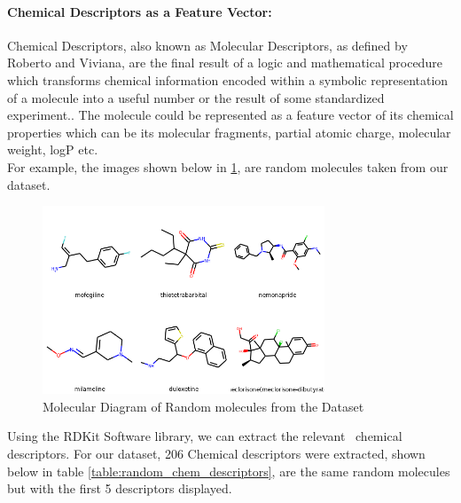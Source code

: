 \documentclass[a4paper,12pt]{report}
\begin{document}
				\paragraph{Chemical Descriptors as a Feature Vector:} 
				Chemical Descriptors, also known as Molecular Descriptors, as defined by Roberto and Viviana, are the final result of a logic and mathematical procedure which transforms chemical information encoded within a symbolic representation of a molecule into a useful number or the result of some standardized experiment.\cite{RobertoViviana2009}.
				The molecule could be represented as a feature vector of its chemical properties which can be its molecular fragments, partial atomic charge, molecular weight, logP etc. \\
				For example, the images shown below in \ref{fig:random_molecules}, are random molecules taken from our dataset.
					\begin{figure}[h!]
						\centering
						\includegraphics[width=0.75\textwidth,height=0.35\textheight]{images/random_molecules.png}
						\caption{Molecular Diagram of Random molecules from the Dataset}
						\label{fig:random_molecules}
					\end{figure}
				Using the RDKit Software library, we can extract the relevant ~chemical descriptors. For our dataset, 206 Chemical descriptors were extracted, shown below in table \ref{table:random_chem_descriptors}, are the same random molecules but with the first 5 descriptors displayed.
				
\end{document}
